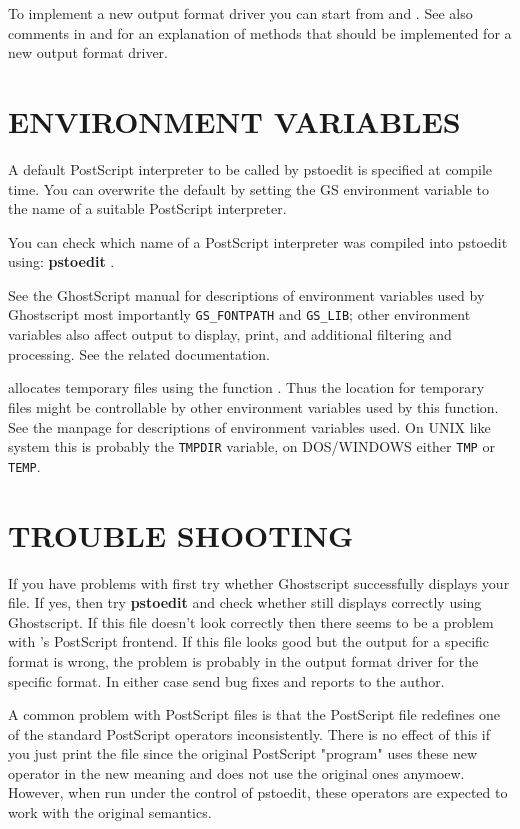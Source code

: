 \documentclass[english,a4paper]{article}
\begin{document}
    To implement a new output format driver you can start from  and
    . See also comments in  and
     for an explanation of methods that should be implemented
    for a new output format driver.


\section{ENVIRONMENT VARIABLES}

A default PostScript interpreter to be called by pstoedit is specified at
compile time. You can overwrite the default by setting the GS environment
variable to the name of a suitable PostScript interpreter.

You can check which name of a PostScript interpreter was compiled into
pstoedit using: \textbf{pstoedit} .

See the GhostScript manual for descriptions of environment variables used by
Ghostscript most importantly \verb+GS_FONTPATH+ and \verb+GS_LIB+; other
environment variables also affect output to display, print, and additional
filtering and processing. See the related documentation.

 allocates temporary files using the function .
Thus the location for temporary files might be controllable by other
environment variables used by this function. See the  manpage
for descriptions of environment variables used. On UNIX like system this is
probably the \verb+TMPDIR+ variable, on DOS/WINDOWS either \verb+TMP+ or
\verb+TEMP+.

\section{TROUBLE SHOOTING}

If you have problems with  first try whether Ghostscript
successfully displays your file. If yes, then try 
\textbf{pstoedit}    
and check whether  still displays correctly using
Ghostscript. If this file doesn't look correctly then there seems to be a
problem with 's PostScript frontend. If this file looks good
but the output for a specific format is wrong, the problem is probably in
the output format driver for the specific format. In either case send bug fixes and
reports to the author.

A common problem with PostScript files is that the PostScript file redefines
one of the standard PostScript operators inconsistently. There is no effect
of this if you just print the file since the original PostScript "program"
uses these new operator in the new meaning and does not use the original
ones anymoew. However, when run under the control of pstoedit, these
operators are expected to work with the original semantics.
\end{document}

